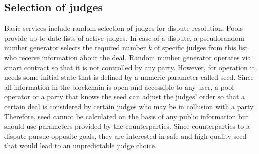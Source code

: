 \documentclass[12pt]{article}
\begin{document}
\subsection{Selection of judges}
Basic services include random selection of judges for dispute resolution. Pools provide up-to-date lists of active judges. In case of a
dispute, a pseudorandom number generator selects the required number $k$ of specific judges from this list who receive information about the
deal. Random number generator operates via smart contract so that it is not controlled by any party. However, for operation it needs some
initial state that is defined by a numeric parameter called seed. Since all information in the blockchain is open and accessible to any
user, a pool operator or a party that knows the seed can adjust the judges’ order so that a certain deal is considered by certain judges who
may be in collusion with a party. Therefore, seed cannot be calculated on the basis of any public information but should use parameters
provided by the counterparties. Since counterparties to a dispute pursue opposite goals, they are interested in safe and high-quality seed
that would lead to an unpredictable judge choice. 
\end{document}
